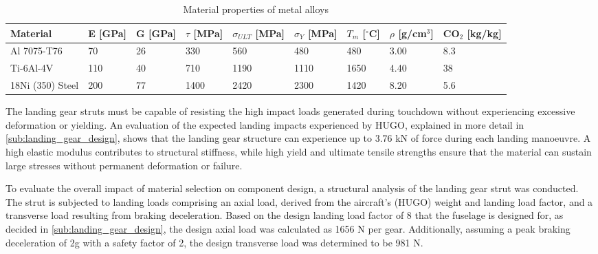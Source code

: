 \begin{table}[H]
    \centering
    \caption{Material properties of metal alloys }
    \label{tab:material_properties_metals}
    \begin{tabular}{|p{3cm}|p{1.1cm}|p{1.1cm}|p{1.2cm}|p{1.4cm}|p{1.3cm}|p{1.2cm}|p{1.2cm}|p{1.2cm}|}
        \hline
        \textbf{Material} &
        \textbf{E [GPa]} &
        \textbf{G [GPa]} &
        \textbf{$\tau$ [MPa]} &
        \textbf{$\sigma_{ULT}$ [MPa]} &
        \textbf{$\sigma_Y$ [MPa]} &
        \textbf{$T_m$ [$^\circ$C]} &
        \textbf{$\rho$ [g/cm$^3$]} &
        \textbf{CO$_2$ [kg/kg]} \\
        \hline\hline
        Al 7075-T76
        & 70 & 26 & 330 & 560 & 480 & 480 & 3.00 & 8.3 \\
        \hline
        Ti-6Al-4V
        & 110 & 40 & 710 & 1190 & 1110 & 1650 & 4.40 & 38 \\
        \hline
        18Ni (350) Steel
        & 200 & 77 & 1400 & 2420 & 2300 & 1420 & 8.20 & 5.6 \\
        \hline
    \end{tabular}
\end{table}


The landing gear struts must be capable of resisting the high impact loads generated during touchdown without experiencing excessive deformation or yielding. An evaluation of the expected landing impacts experienced by HUGO, explained in more detail in \autoref{sub:landing_gear_design}, shows that the landing gear structure can experience up to 3.76 kN of force during each landing manoeuvre.  
 A high elastic modulus contributes to structural stiffness, while high yield and ultimate tensile strengths ensure that the material can sustain large stresses without permanent deformation or failure. 


To evaluate the overall impact of material selection on component design, a structural analysis of the landing gear strut was conducted. The strut is subjected to landing loads comprising an axial load, derived from the aircraft's (HUGO) weight and landing load factor, and a transverse load resulting from braking deceleration. Based on the design landing load factor of 8 that the fuselage is designed for, as decided in \autoref{sub:landing_gear_design}, the design axial load was calculated as 1656 N per gear. Additionally, assuming a peak braking deceleration of 2g with a safety factor of 2, the design transverse load was determined to be 981 N. 

